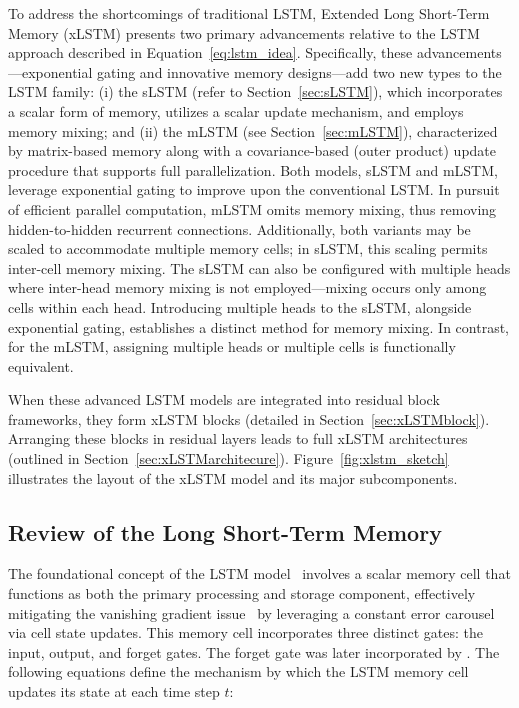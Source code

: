 To address the shortcomings of traditional LSTM, Extended Long Short-Term Memory (xLSTM) presents two primary advancements relative to the LSTM approach described in Equation~\eqref{eq:lstm_idea}. Specifically, these advancements—exponential gating and innovative memory designs—add two new types to the LSTM family: (i) the sLSTM (refer to Section~\ref{sec:sLSTM}), which incorporates a scalar form of memory, utilizes a scalar update mechanism, and employs memory mixing; and (ii) the mLSTM (see Section~\ref{sec:mLSTM}), characterized by matrix-based memory along with a covariance-based (outer product) update procedure that supports full parallelization. Both models, sLSTM and mLSTM, leverage exponential gating to improve upon the conventional LSTM. In pursuit of efficient parallel computation, mLSTM omits memory mixing, thus removing hidden-to-hidden recurrent connections. Additionally, both variants may be scaled to accommodate multiple memory cells; in sLSTM, this scaling permits inter-cell memory mixing. The sLSTM can also be configured with multiple heads where inter-head memory mixing is not employed—mixing occurs only among cells within each head. Introducing multiple heads to the sLSTM, alongside exponential gating, establishes a distinct method for memory mixing. In contrast, for the mLSTM, assigning multiple heads or multiple cells is functionally equivalent.

When these advanced LSTM models are integrated into residual block frameworks, they form xLSTM blocks (detailed in Section~\ref{sec:xLSTMblock}). Arranging these blocks in residual layers leads to full xLSTM architectures (outlined in Section~\ref{sec:xLSTMarchitecure}). Figure~\ref{fig:xlstm_sketch} illustrates the layout of the xLSTM model and its major subcomponents.

\subsection{Review of the Long Short-Term Memory}
\label{sec:orgLSTM}

The foundational concept of the LSTM model~\citep{Hochreiter:91,Hochreiter:97nips,Hochreiter:97} involves a scalar memory cell that functions as both the primary processing and storage component, effectively mitigating the vanishing gradient issue~\citep{Hochreiter:91,Hochreiter:00book} by leveraging a constant error carousel via cell state updates. This memory cell incorporates three distinct gates: the input, output, and forget gates. The forget gate was later incorporated by \citet{Gers:00}. The following equations define the mechanism by which the LSTM memory cell updates its state at each time step $t$:

